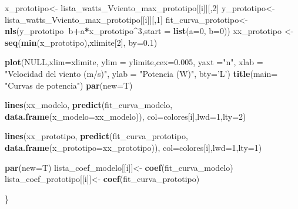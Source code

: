 \documentclass[]{article}
\newenvironment{Shaded}{\begin{snugshade}}{\end{snugshade}}
\newcommand{\KeywordTok}[1]{\textcolor[rgb]{0.13,0.29,0.53}{\textbf{#1}}}
\newcommand{\DataTypeTok}[1]{\textcolor[rgb]{0.13,0.29,0.53}{#1}}
\newcommand{\DecValTok}[1]{\textcolor[rgb]{0.00,0.00,0.81}{#1}}
\newcommand{\FloatTok}[1]{\textcolor[rgb]{0.00,0.00,0.81}{#1}}
\newcommand{\StringTok}[1]{\textcolor[rgb]{0.31,0.60,0.02}{#1}}
\newcommand{\OtherTok}[1]{\textcolor[rgb]{0.56,0.35,0.01}{#1}}
\newcommand{\OperatorTok}[1]{\textcolor[rgb]{0.81,0.36,0.00}{\textbf{#1}}}
\newcommand{\NormalTok}[1]{#1}
\begin{document}
\begin{Shaded}
\begin{Highlighting}[]
{{{{{{{{    
\NormalTok{    x_prototipo<-}\StringTok{ }\NormalTok{lista_watts_Vviento_max_prototipo[[i]][,}\DecValTok{2}\NormalTok{]}
\NormalTok{    y_prototipo<-}\StringTok{ }\NormalTok{lista_watts_Vviento_max_prototipo[[i]][,}\DecValTok{1}\NormalTok{]}
\NormalTok{    fit_curva_prototipo<-}\KeywordTok{nls}\NormalTok{(y_prototipo}\OperatorTok{~}\NormalTok{b}\OperatorTok{+}\NormalTok{a}\OperatorTok{*}\NormalTok{x_prototipo}\OperatorTok{^}\DecValTok{3}\NormalTok{,}\DataTypeTok{start =} \KeywordTok{list}\NormalTok{(}\DataTypeTok{a=}\DecValTok{0}\NormalTok{, }\DataTypeTok{b=}\DecValTok{0}\NormalTok{))}
\NormalTok{    xx_prototipo <-}\StringTok{ }\KeywordTok{seq}\NormalTok{(}\KeywordTok{min}\NormalTok{(x_prototipo),xlimite[}\DecValTok{2}\NormalTok{], }\DataTypeTok{by=}\FloatTok{0.1}\NormalTok{)}
    
    
    
    
    \KeywordTok{plot}\NormalTok{(}\OtherTok{NULL}\NormalTok{,}\DataTypeTok{xlim=}\NormalTok{xlimite,}
         \DataTypeTok{ylim =}\NormalTok{ ylimite,}\DataTypeTok{cex=}\FloatTok{0.005}\NormalTok{, }\DataTypeTok{yaxt =}\StringTok{"n"}\NormalTok{,}
         \DataTypeTok{xlab =} \StringTok{"Velocidad del viento (m/s)"}\NormalTok{, }\DataTypeTok{ylab =} \StringTok{"Potencia (W)"}\NormalTok{, }\DataTypeTok{bty=}\StringTok{'L'}\NormalTok{)}
    \KeywordTok{title}\NormalTok{(}\DataTypeTok{main=} \StringTok{"Curvas de potencia"}\NormalTok{)}
    \KeywordTok{par}\NormalTok{(}\DataTypeTok{new=}\NormalTok{T)}
    
    \KeywordTok{lines}\NormalTok{(xx_modelo, }\KeywordTok{predict}\NormalTok{(fit_curva_modelo, }\KeywordTok{data.frame}\NormalTok{(}\DataTypeTok{x_modelo=}\NormalTok{xx_modelo)), }\DataTypeTok{col=}\NormalTok{colores[i],}\DataTypeTok{lwd=}\DecValTok{1}\NormalTok{,}\DataTypeTok{lty=}\DecValTok{2}\NormalTok{)}
    
    \KeywordTok{lines}\NormalTok{(xx_prototipo, }\KeywordTok{predict}\NormalTok{(fit_curva_prototipo, }\KeywordTok{data.frame}\NormalTok{(}\DataTypeTok{x_prototipo=}\NormalTok{xx_prototipo)), }\DataTypeTok{col=}\NormalTok{colores[i],}\DataTypeTok{lwd=}\DecValTok{1}\NormalTok{,}\DataTypeTok{lty=}\DecValTok{1}\NormalTok{)}
    
    
    \KeywordTok{par}\NormalTok{(}\DataTypeTok{new=}\NormalTok{T)}
\NormalTok{    lista_coef_modelo[[i]]<-}\StringTok{ }\KeywordTok{coef}\NormalTok{(fit_curva_modelo)}
\NormalTok{    lista_coef_prototipo[[i]]<-}\StringTok{ }\KeywordTok{coef}\NormalTok{(fit_curva_prototipo)}
    
\NormalTok{  \}}
  
}}}}}}}}
\end{Highlighting}
\end{Shaded}
\end{document}
